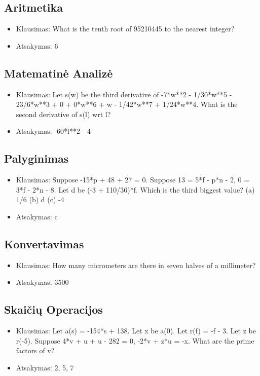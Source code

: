 \documentclass[conference]{IEEEtran}
\begin{document}
\subsection{Aritmetika}
\begin{itemize}
    \item Klausimas: What is the tenth root of 95210445 to the nearest integer?
    \item Atsakymas: 6
\end{itemize}
\subsection{Matematinė Analizė}
\begin{itemize}
    \item Klausimas: Let s(w) be the third derivative of -7*w**2 - 1/30*w**5 - 23/6*w**3 + 0 + 0*w**6 + w - 1/42*w**7 + 1/24*w**4. What is the second derivative of s(l) wrt l?
    \item Atsakymas: -60*l**2 - 4
\end{itemize}
\subsection{Palyginimas}
\begin{itemize}
    \item Klausimas: Suppose -15*p + 48 + 27 = 0. Suppose 13 = 5*f - p*n - 2, 0 = 3*f - 2*n - 8. Let d be (-3 + 110/36)*f. Which is the third biggest value?  (a) 1/6  (b) d  (c) -4
    \item Atsakymas: c
\end{itemize}
\subsection{Konvertavimas}
\begin{itemize}
    \item Klausimas: How many micrometers are there in seven halves of a millimeter?
    \item Atsakymas: 3500
\end{itemize}
\subsection{Skaičių Operacijos}
\begin{itemize}
    \item Klausimas: Let a(s) = -154*s + 138. Let x be a(0). Let r(f) = -f - 3. Let z be r(-5). Suppose 4*v + u + u - 282 = 0, -2*v + z*u = -x. What are the prime factors of v?
    \item Atsakymas: 2, 5, 7
\end{itemize}
\end{document}
